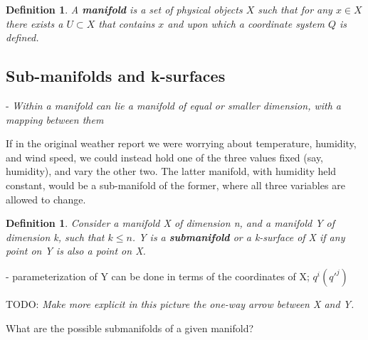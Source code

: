 \documentclass{book}
\newtheorem{defn}[equation]{Definition}
\begin{document}
 
\begin{defn}
	A \textbf{manifold} is a set of physical objects $X$ such that for any $x \in X$ there exists a $U \subset X$ that contains $x$ and upon which a coordinate system $Q$ is defined.
\end{defn}



\subsection{Sub-manifolds and k-surfaces}

- \emph{Within a manifold can lie a manifold of equal or smaller dimension, with a mapping between them}

If in the original weather report we were worrying about temperature, humidity, and wind speed, we could instead hold one of the three values fixed (say, humidity), and vary the other two. The latter manifold, with humidity held constant, would be a sub-manifold of the former, where all three variables are allowed to change.  



\begin{defn}
	Consider a manifold X of dimension n, and a manifold Y of dimension k, such that $k \leq n$. Y is a \textbf{submanifold} or a k-surface of X if any point on Y is also a point on X. 
\end{defn}

- parameterization of Y can be done in terms of the coordinates of X; $q^i(q'^j)$



TODO: \emph{Make more explicit in this picture the one-way arrow between X and Y.}


What are the possible submanifolds of a given manifold?
\end{document}
